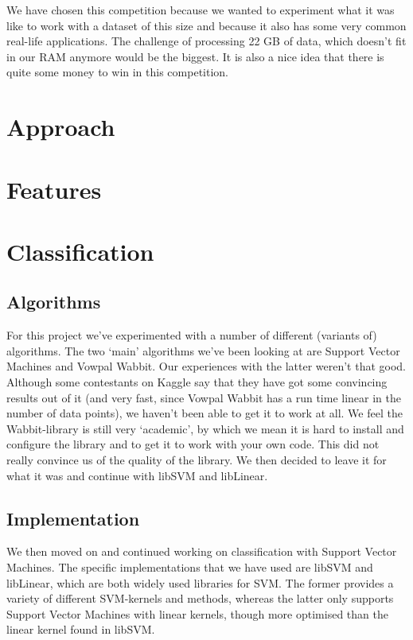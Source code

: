 \documentclass[a4paper]{article}
\begin{document}
We have chosen this competition because we wanted to experiment what it was like to work with a dataset of this size and because it also has some very common real-life applications. The challenge of processing 22 GB of data, which doesn't fit in our RAM anymore would be the biggest. It is also a nice idea that there is quite some money to win in this competition.

\section{Approach}


\section{Features}


\section{Classification}
\subsection{Algorithms}
For this project we've experimented with a number of different (variants of) algorithms. The two `main' algorithms we've been looking at are Support Vector Machines and Vowpal Wabbit. Our experiences with the latter weren't that good. Although some contestants on Kaggle say that they have got some convincing results out of it (and very fast, since Vowpal Wabbit has a run time linear in the number of data points), we haven't been able to get it to work at all. We feel the Wabbit-library is still very `academic', by which we mean it is hard to install and configure the library and to get it to work with your own code. This did not really convince us of the quality of the library. We then decided to leave it for what it was and continue with libSVM and libLinear.
\subsection{Implementation}
We then moved on and continued working on classification with Support Vector Machines. The specific implementations that we have used are libSVM and libLinear, which are both widely used libraries for SVM. The former provides a variety of different SVM-kernels and methods, whereas the latter only supports Support Vector Machines with linear kernels, though more optimised than the linear kernel found in libSVM.
\end{document}
